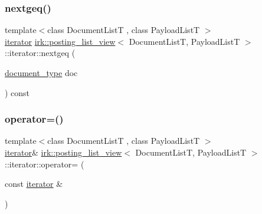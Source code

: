 \subsubsection{\texorpdfstring{nextgeq()}{nextgeq()}}
{\footnotesize\ttfamily template$<$class Document\+ListT , class Payload\+ListT $>$ \\
\mbox{\hyperlink{classirk_1_1posting__list__view_1_1iterator}{iterator}} \mbox{\hyperlink{classirk_1_1posting__list__view}{irk\+::posting\+\_\+list\+\_\+view}}$<$ Document\+ListT, Payload\+ListT $>$\+::iterator\+::nextgeq (\begin{DoxyParamCaption}\item[{\mbox{\hyperlink{classirk_1_1posting__list__view_ac4615e6e3d8ee1eb9a847b7a34919977}{document\+\_\+type}}}]{doc }\end{DoxyParamCaption}) const\hspace{0.3cm}{\ttfamily [inline]}}

\mbox{\label{classirk_1_1posting__list__view_1_1iterator_acf1e7434a45368f951fbd378c3b7afaf}} 
\subsubsection{\texorpdfstring{operator=()}{operator=()}\hspace{0.1cm}{\footnotesize\ttfamily [1/2]}}
{\footnotesize\ttfamily template$<$class Document\+ListT , class Payload\+ListT $>$ \\
\mbox{\hyperlink{classirk_1_1posting__list__view_1_1iterator}{iterator}}\& \mbox{\hyperlink{classirk_1_1posting__list__view}{irk\+::posting\+\_\+list\+\_\+view}}$<$ Document\+ListT, Payload\+ListT $>$\+::iterator\+::operator= (\begin{DoxyParamCaption}\item[{const \mbox{\hyperlink{classirk_1_1posting__list__view_1_1iterator}{iterator}} \&}]{ }\end{DoxyParamCaption})\hspace{0.3cm}{\ttfamily [default]}}

\mbox{\label{classirk_1_1posting__list__view_1_1iterator_a1ce474d690d32fc51906fa044bcea967}} 
